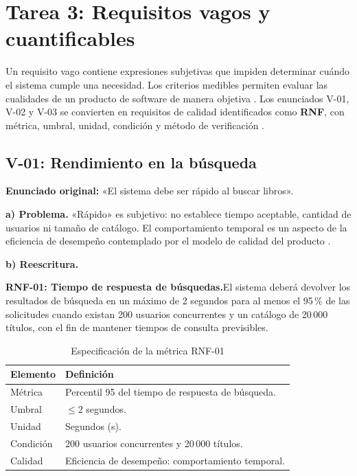 \documentclass[conference,onecolumn]{IEEEtran}
\newcommand{\req}[1]{\par\noindent\textbf{#1.}\hspace{0.5em}}
\begin{document}
\section{Tarea 3: Requisitos vagos y cuantificables}
Un requisito vago contiene expresiones subjetivas que impiden determinar cuándo el sistema cumple una necesidad. Los criterios medibles permiten evaluar las cualidades de un producto de software de manera objetiva \cite{ieee29148,iso25010}. Los enunciados V-01, V-02 y V-03 se convierten en requisitos de calidad identificados como \textbf{RNF}, con métrica, umbral, unidad, condición y método de verificación \cite{uteqsemana1,iso25010}.

\subsection{V-01: Rendimiento en la búsqueda}
\textbf{Enunciado original:} «El sistema debe ser rápido al buscar libros».

\textbf{a) Problema.} «Rápido» es subjetivo: no establece tiempo aceptable, cantidad de usuarios ni tamaño de catálogo. El comportamiento temporal es un aspecto de la eficiencia de desempeño contemplado por el modelo de calidad del producto \cite{iso25010}.

\textbf{b) Reescritura.}
\req{RNF-01: Tiempo de respuesta de búsquedas}El sistema deberá devolver los resultados de búsqueda en un máximo de 2 segundos para al menos el 95\,\% de las solicitudes cuando existan 200 usuarios concurrentes y un catálogo de 20\,000 títulos, con el fin de mantener tiempos de consulta previsibles.

\begin{table}[H]
\caption{Especificación de la métrica RNF-01}
\label{tab:rnf1}
\footnotesize\centering
\begin{tabularx}{\columnwidth}{@{}p{}Y@{}}
\toprule
\textbf{Elemento} & \textbf{Definición}\\
\midrule
Métrica & Percentil 95 del tiempo de respuesta de búsqueda.\\
Umbral & $\leq 2$ segundos.\\
Unidad & Segundos (s).\\
Condición & 200 usuarios concurrentes y 20\,000 títulos.\\
Calidad & Eficiencia de desempeño: comportamiento temporal.\\
\bottomrule
\end{tabularx}
\end{table}
\end{document}
